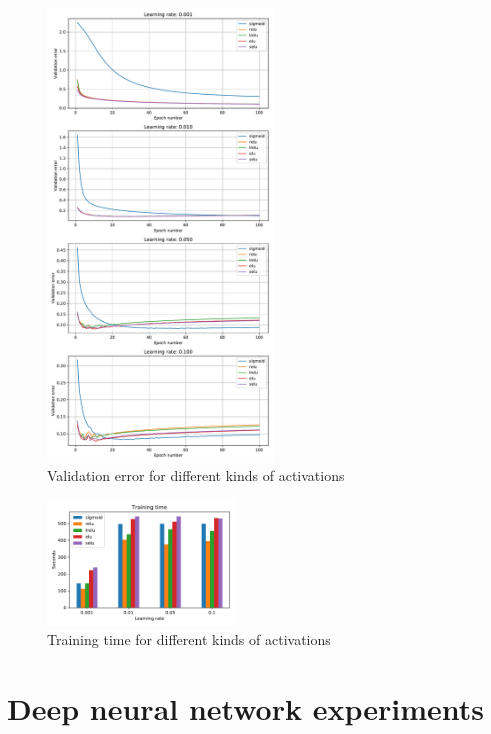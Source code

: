 \documentclass{article}
\begin{document}
\begin{figure}[tb]
\vskip 5mm
\begin{center}
\centerline{\includegraphics[width=60mm]{activations_val_error}}
\caption{Validation error for different kinds of activations}
\label{fig:activations_val_error}
\end{center}
\vskip -5mm
\end{figure} 

\begin{figure}[tb]
\vskip 5mm
\begin{center}
\centerline{\includegraphics[width=50mm]{activations_training_time}}
\caption{Training time for different kinds of activations}
\label{fig:activations_training_time}
\end{center}
\vskip -5mm
\end{figure} 

\section{Deep neural network experiments}
\label{sec:dnnexpts}
\end{document}
